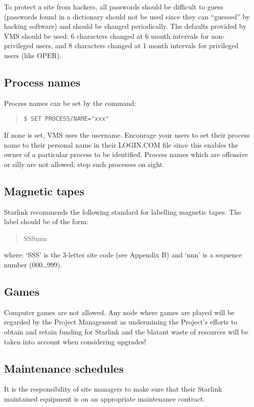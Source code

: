 To protect a site from hackers, all passwords should be difficult to guess
(passwords found in a dictionary should not be used since they can ``guessed''
by hacking software) and should be changed periodically.
The defaults provided by VMS should be used: 6 characters changed at
6 month intervals for non-privileged users, and 8 characters changed at 1 month
intervals for privileged users (like OPER).

\subsection {Process names}

Process names can be set by the command:
\begin{quote}
{\tt \$ SET PROCESS/NAME="xxx"}
\end{quote}
If none is set, VMS uses the username.
Encourage your users to set their process name to their personal name in their
LOGIN.COM file since this enables the owner of a particular process to be
identified.
Process names which are offensive or silly are not allowed; stop such processes
on sight.

\subsection {Magnetic tapes}

Starlink recommends the following standard for labelling magnetic tapes.
The label should be of the form:
\begin{quote}
SSSnnn
\end{quote}
where: `SSS' is the 3-letter site code (see Appendix B) and
`nnn' is a sequence number (000\ldots999).

\subsection {Games}

Computer games are not allowed.
Any node where games are played will be regarded by the Project Management as
undermining the Project's efforts to obtain and retain funding for Starlink and
the blatant waste of resources will be taken into account when considering
upgrades!

\subsection {Maintenance schedules}

It is the responsibility of site managers to make sure that their Starlink
maintained equipment is on an appropriate maintenance contract.

